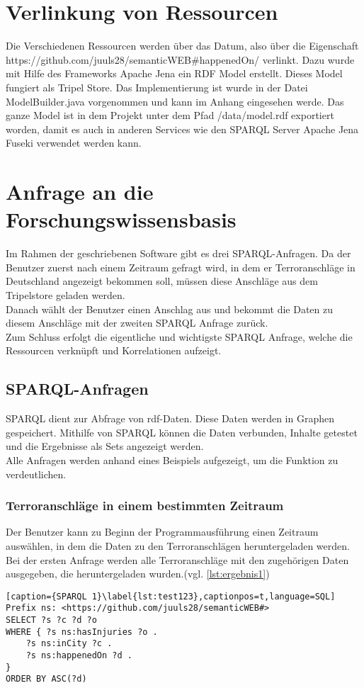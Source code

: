 \documentclass[a4paper,10pt,parskip]{article}
\begin{document}
\section{Verlinkung von Ressourcen}

Die Verschiedenen Ressourcen werden über das Datum, also über die Eigenschaft https://github.com/juuls28/semanticWEB\#happenedOn/ verlinkt. Dazu wurde mit Hilfe des Frameworks Apache Jena ein RDF Model erstellt. Dieses Model fungiert als Tripel Store. Das Implementierung ist wurde in der Datei ModelBuilder.java vorgenommen und kann im Anhang  eingesehen werde. Das ganze Model ist in dem Projekt unter dem Pfad /data/model.rdf exportiert worden, damit es auch in anderen Services wie den SPARQL Server Apache Jena Fuseki verwendet werden kann.



\section{Anfrage an die Forschungswissensbasis}
Im Rahmen der geschriebenen Software gibt es drei SPARQL-Anfragen. Da der Benutzer zuerst nach einem Zeitraum gefragt wird, in dem er Terroranschläge in Deutschland angezeigt bekommen soll, müssen diese Anschläge aus dem Tripelstore geladen werden.\\
Danach wählt der Benutzer einen Anschlag aus und bekommt die Daten zu diesem Anschläge mit der zweiten SPARQL Anfrage zurück.\\
Zum Schluss erfolgt die eigentliche und wichtigste SPARQL Anfrage, welche die Ressourcen verknüpft und Korrelationen aufzeigt.
\subsection{SPARQL-Anfragen}
SPARQL dient zur Abfrage von \ac{rdf}-Daten. Diese Daten werden in Graphen gespeichert. Mithilfe von SPARQL können die Daten verbunden, Inhalte getestet und die Ergebnisse als Sets angezeigt werden.\\
Alle Anfragen werden anhand eines Beispiels aufgezeigt, um die Funktion zu verdeutlichen.
\subsubsection{Terroranschläge in einem bestimmten Zeitraum}
Der Benutzer kann zu Beginn der Programmausführung einen Zeitraum auswählen, in dem die Daten zu den Terroranschlägen heruntergeladen werden.\\
Bei der ersten Anfrage werden alle Terroranschläge mit den zugehörigen Daten ausgegeben, die heruntergeladen wurden.(vgl. \ref{lst:ergebnis1})\\
\begin{lstlisting}[caption={SPARQL 1}\label{lst:test123},captionpos=t,language=SQL] 
Prefix ns: <https://github.com/juuls28/semanticWEB#>
SELECT ?s ?c ?d ?o
WHERE { ?s ns:hasInjuries ?o . 
	?s ns:inCity ?c .
	?s ns:happenedOn ?d .
}
ORDER BY ASC(?d)
\end{lstlisting}
\end{document}
